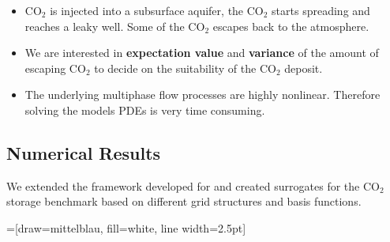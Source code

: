 \documentclass[final,hyperref={pdfpagelabels=false},table]{beamer}
\begin{document}
\begin{frame}
\begin{columns}[T]
\begin{column}{\colCWidth}
\begin{itemize}
\item CO$_2$ is injected into a subsurface aquifer, the CO$_2$ starts spreading and reaches a leaky well. Some of the CO$_2$ escapes back to the atmosphere.
\item We are interested in \textbf{expectation value} and \textbf{variance} of the amount of escaping CO$_2$ to decide on the suitability of the CO$_2$ deposit.
\item The underlying multiphase flow processes are highly nonlinear. Therefore solving the models PDEs is very time consuming.
\end{itemize}

\subsection{Numerical Results}

We extended the framework developed for \cite{FF} and created surrogates for the CO$_2$ storage benchmark based on different grid structures and basis functions.

=[draw=mittelblau, fill=white, line width=2.5pt]


\end{column}
\end{columns}
\end{frame}
\end{document}

